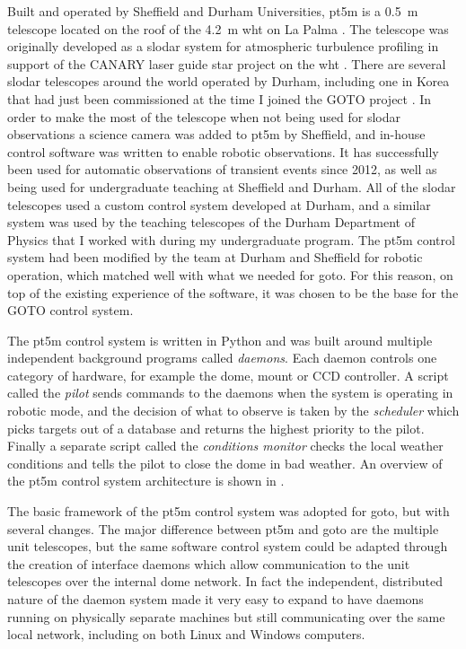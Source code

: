 \begin{colsection}
\begin{colsection}
Built and operated by Sheffield and Durham Universities, \gls{pt5m} is a \SI{0.5}{\metre} telescope located on the roof of the \SI{4.2}{\metre} \gls{wht} on La Palma \citep{pt5m}. The telescope was originally developed as a \gls{slodar} system for atmospheric turbulence profiling in support of the CANARY laser guide star project on the \gls{wht} \citep{SLODAR_LaPalma, CANARY}. There are several \gls{slodar} telescopes around the world operated by Durham, including one in Korea that had just been commissioned at the time I joined the GOTO project \citep{SLODAR_Korea}. In order to make the most of the telescope when not being used for \gls{slodar} observations a science camera was added to \gls{pt5m} by Sheffield, and in-house control software was written to enable robotic observations. It has successfully been used for automatic observations of transient events since 2012, as well as being used for undergraduate teaching at Sheffield and Durham. All of the \gls{slodar} telescopes used a custom control system developed at Durham, and a similar system was used by the teaching telescopes of the Durham Department of Physics that I worked with during my undergraduate program. The \gls{pt5m} control system had been modified by the team at Durham and Sheffield for robotic operation, which matched well with what we needed for \gls{goto}. For this reason, on top of the existing experience of the software, it was chosen to be the base for the GOTO control system.

The \gls{pt5m} control system is written in Python and was built around multiple independent background programs called \emph{daemons}. Each daemon controls one category of hardware, for example the dome, mount or CCD controller. A script called the \emph{pilot} sends commands to the daemons when the system is operating in robotic mode, and the decision of what to observe is taken by the \emph{scheduler} which picks targets out of a database and returns the highest priority to the pilot. Finally a separate script called the \emph{conditions monitor} checks the local weather conditions and tells the pilot to close the dome in bad weather. An overview of the pt5m control system architecture is shown in .

The basic framework of the pt5m control system was adopted for \gls{goto}, but with several changes. The major difference between \gls{pt5m} and \gls{goto} are the multiple unit telescopes, but the same software control system could be adapted through the creation of interface daemons which allow communication to the unit telescopes over the internal dome network. In fact the independent, distributed nature of the daemon system made it very easy to expand to have daemons running on physically separate machines but still communicating over the same local network, including on both Linux and Windows computers.


\end{colsection}
\end{colsection}
